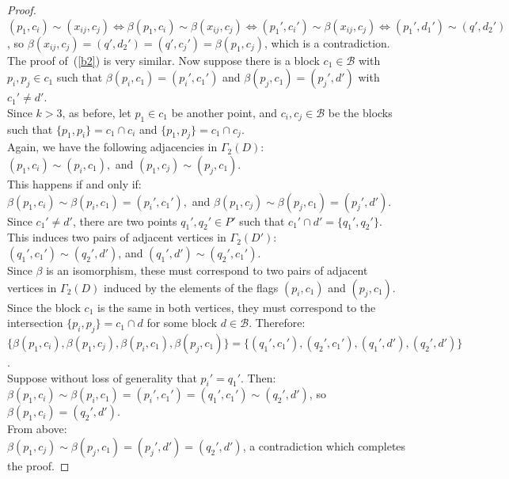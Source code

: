 \documentclass[letterpaper,10pt]{article}
\theoremstyle{plain}
\theoremstyle{definition}
\begin{document}
\begin{proof}
$(p_1,c_i)\sim(x_{ij},c_j)\iff\beta(p_1,c_i)\sim\beta(x_{ij},c_j)\iff(p_1',c_i')\sim\beta(x_{ij},c_j)\iff(p_1',d_1')\sim(q',d_2')$, so $\beta(x_{ij},c_j)=(q',d_2')=(q',c_j')=\beta(p_1,c_j)$, which is a contradiction.\\

The proof of~(\ref{b2}) is very similar. Now suppose there is a block $c_1\in\mathcal{B}$ with $p_i,p_j\in c_1$ such that $\beta(p_i,c_1)=(p_i',c_1')$ and $\beta(p_j,c_1)=(p_j',d')$ with $c_1'\neq d'$.\\

Since $k>3$, as before, let $p_1\in c_1$ be another point, and $c_i,c_j\in\mathcal{B}$ be the blocks such that $\{p_1,p_i\}=c_1\cap c_i$ and $\{p_1,p_j\}=c_1\cap c_j$.\\

Again, we have the following adjacencies in $\Gamma_2(D)$:\\

$(p_1,c_i)\sim(p_i,c_1),$ and $(p_1,c_j)\sim(p_j,c_1)$.\\

This happens if and only if:\\

$\beta(p_1,c_i)\sim\beta(p_i,c_1)=(p_i',c_1'),$ and $\beta(p_1,c_j)\sim\beta(p_j,c_1)=(p_j',d')$.\\

Since $c_1'\neq d'$, there are two points $q_1',q_2'\in P'$ such that $c_1'\cap d'=\{q_1',q_2'\}$. This induces two pairs of adjacent vertices in $\Gamma_2(D')$:\\

$(q_1',c_1')\sim(q_2',d')$, and $(q_1',d')\sim(q_2',c_1')$.\\

Since $\beta$ is an isomorphism, these must correspond to two pairs of adjacent vertices in $\Gamma_2(D)$ induced by the elements of the flags $(p_i,c_1)$ and $(p_j,c_1)$. Since the block $c_1$ is the same in both vertices, they must correspond to the intersection $\{p_i,p_j\}=c_1\cap d$ for some block $d\in\mathcal{B}$. Therefore:\\

$\{\beta(p_1,c_i),\beta(p_1,c_j),\beta(p_i,c_1),\beta(p_j,c_1)\}=\{(q_1',c_1'),(q_2',c_1'),(q_1',d'),(q_2',d')\}$.\\

Suppose without loss of generality that $p_i'=q_1'$. Then:\\

$\beta(p_1,c_i)\sim\beta(p_i,c_1)=(p_i',c_1')=(q_1',c_1')\sim(q_2',d')$, so $\beta(p_1,c_i)=(q_2',d')$.\\

From above:\\

$\beta(p_1,c_j)\sim\beta(p_j,c_1)=(p_j',d')=(q_2',d')$, a contradiction which completes the proof.
\end{proof}
\end{document}

